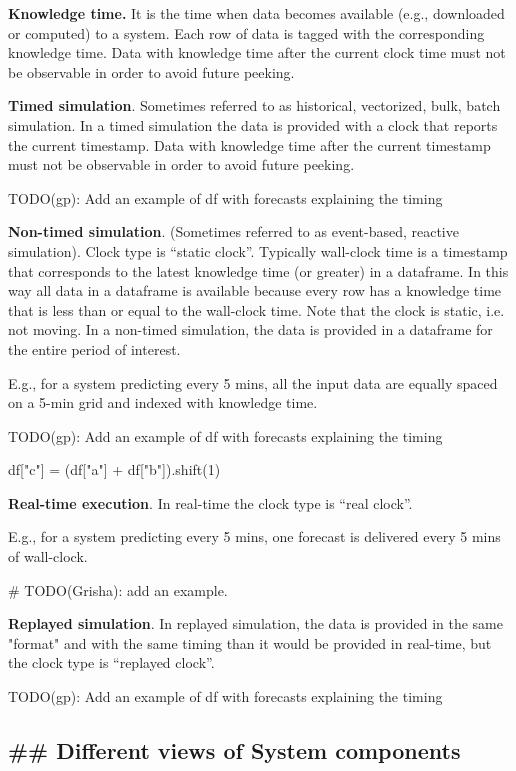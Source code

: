 \documentclass[11pt, reqno]{amsart}
\begin{document}
\textbf{Knowledge time.} It is the time when data becomes available
(e.g., downloaded or computed) to a system. Each row of data is tagged
with the corresponding knowledge time. Data with knowledge time after
the current clock time must not be observable in order to avoid future
peeking.

\textbf{Timed simulation}. Sometimes referred to as historical,
vectorized, bulk, batch simulation. In a timed simulation the data is
provided with a clock that reports the current timestamp. Data with
knowledge time after the current timestamp must not be observable in
order to avoid future peeking.

TODO(gp): Add an example of df with forecasts explaining the timing

\textbf{Non-timed simulation}. (Sometimes referred to as event-based,
reactive simulation). Clock type is ``static clock''. Typically
wall-clock time is a timestamp that corresponds to the latest knowledge
time (or greater) in a dataframe. In this way all data in a dataframe is
available because every row has a knowledge time that is less than or
equal to the wall-clock time. Note that the clock is static, i.e. not
moving. In a non-timed simulation, the data is provided in a dataframe
for the entire period of interest.

E.g., for a system predicting every 5 mins, all the input data are
equally spaced on a 5-min grid and indexed with knowledge time.

TODO(gp): Add an example of df with forecasts explaining the timing

df{[}"c"{]} = (df{[}"a"{]} + df{[}"b"{]}).shift(1)

\textbf{Real-time execution}. In real-time the clock type is ``real
clock''.

E.g., for a system predicting every 5 mins, one forecast is delivered
every 5 mins of wall-clock.

\# TODO(Grisha): add an example.

\textbf{Replayed simulation}. In replayed simulation, the data is
provided in the same "format" and with the same timing than it would be
provided in real-time, but the clock type is ``replayed clock''.

TODO(gp): Add an example of df with forecasts explaining the timing

\hypertarget{different-views-of-system-components}{%
\subsection{\#\# Different views of System
components}\label{different-views-of-system-components}}
\end{document}
